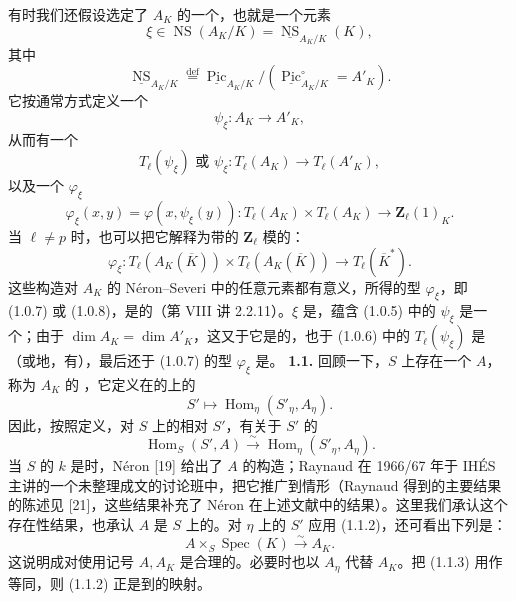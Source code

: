 有时我们还假设选定了 $A_K$ 的一个，也就是一个元素
\[\xi\in\operatorname{NS}(A_K/K)=\underline{\operatorname{NS}}_{A_K/K}(K),\tag{1.0.4}\]
其中
\[\underline{\operatorname{NS}}_{A_K/K}\overset{\mathrm{def}}=\underline{\operatorname{Pic}}_{A_K/K}/(\underline{\operatorname{Pic}}^\circ_{A_K/K}=A'_K).\]
它按通常方式定义一个
\[\psi_\xi:A_K\longrightarrow A'_K,\tag{1.0.5}\]
从而有一个
\[T_\ell(\psi_\xi)\text{ 或 }\psi_\xi:T_\ell(A_K)\longrightarrow T_\ell(A'_K),\tag{1.0.6}\]
以及一个 $\varphi_\xi$
\[\varphi_\xi(x,y)=\varphi(x,\psi_\xi(y)):T_\ell(A_K)\times T_\ell(A_K)\longrightarrow\mathbf Z_\ell(1)_K.\tag{1.0.7}\]
当 $\ell\ne p$ 时，也可以把它解释为带的 $\mathbf Z_\ell$ 模的：
\[\varphi_\xi:T_\ell(A_K(\overline K))\times T_\ell(A_K(\overline K))\longrightarrow T_\ell(\overline K^*).\tag{1.0.8}\]
这些构造对 $A_K$ 的 Néron--Severi 中的任意元素都有意义，所得的型 $\varphi_\xi$，即 (1.0.7) 或 (1.0.8)，是的（第 VIII 讲 2.2.11）。$\xi$ 是，蕴含 (1.0.5) 中的 $\psi_\xi$ 是一个；由于 $\dim A_K=\dim A'_K$，这又于它是的，也于 (1.0.6) 中的 $T_\ell(\psi_\xi)$ 是（或地，有），最后还于 (1.0.7) 的型 $\varphi_\xi$ 是。
\textbf{1.1.} 回顾一下，$S$ 上存在一个 $A$，称为 $A_K$ 的 ，它定义在的上的
\[S'\longmapsto\operatorname{Hom}_\eta(S'_\eta,A_\eta).\tag{1.1.1}\]
因此，按照定义，对 $S$ 上的相对 $S'$，有关于 $S'$ 的
\[\operatorname{Hom}_S(S',A)\xrightarrow\sim\operatorname{Hom}_\eta(S'_\eta,A_\eta).\tag{1.1.2}\]
当 $S$ 的 $k$ 是时，Néron [19] 给出了 $A$ 的构造；Raynaud 在 1966/67 年于 IHÉS 主讲的一个未整理成文的讨论班中，把它推广到情形（Raynaud 得到的主要结果的陈述见 [21]，这些结果补充了 Néron 在上述文献中的结果）。这里我们承认这个存在性结果，也承认 $A$ 是 $S$ 上的。对 $\eta$ 上的 $S'$ 应用 (1.1.2)，还可看出下列是：
\[A\times_S\operatorname{Spec}(K)\xrightarrow\sim A_K.\tag{1.1.3}\]
这说明成对使用记号 $A,A_K$ 是合理的。必要时也以 $A_\eta$ 代替 $A_K$。把 (1.1.3) 用作等同，则 (1.1.2) 正是到的映射。

